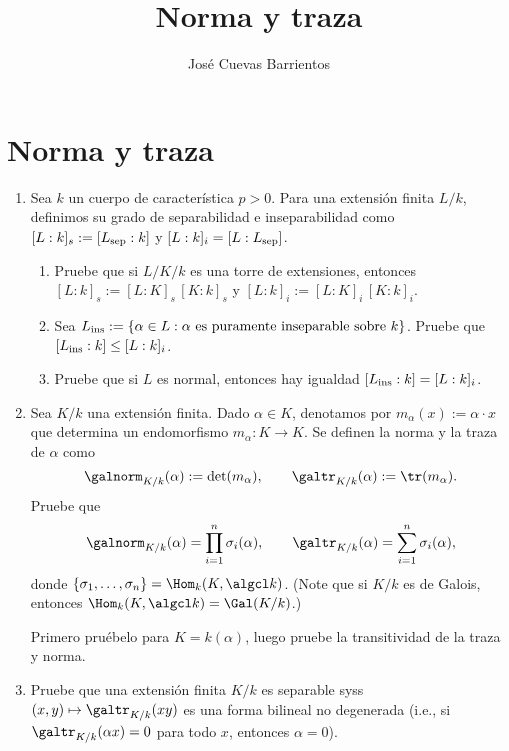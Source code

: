 \documentclass[11pt, reqno]{amsart}
\title{Norma y traza}
\date{\DTMdate{2025-08-27}}
\author{José Cuevas Barrientos}
\begin{document}
\maketitle

\section{Norma y traza}
\begin{enumerate}
	\item Sea $k$ un cuerpo de característica $p > 0$.
		Para una extensión finita $L/k$, definimos su grado de separabilidad e inseparabilidad como $[L : k]_s := [L_{\rm sep} : k]$
		y $[L : k]_i = [L : L_{\rm sep}]$.
		\begin{enumerate}
			\item Pruebe que si $L/K/k$ es una torre de extensiones, entonces $[L : k]_s := [L : K]_s \, [K : k]_s$ y $[L : k]_i
				:= [L : K]_i \, [K : k]_i$.
			\item Sea $L_{\rm ins} := \{ \alpha \in L : \alpha \text{ es puramente inseparable sobre } k \}$.
				Pruebe que $[L_{\rm ins} : k] \le [L : k]_i$.
			\item Pruebe que si $L$ es normal, entonces hay igualdad $[L_{\rm ins} : k] = [L : k]_i$.
		\end{enumerate}

	\item\lookright
		Sea $K/k$ una extensión finita.
		Dado $\alpha \in K$, denotamos por $m_\alpha(x) := \alpha\cdot x$ que determina un endomorfismo $m_\alpha \colon K \to K$.
		Se definen la norma y la traza de $\alpha$ como
		\[
			\galnorm_{K/k}(\alpha) := \det(m_\alpha), \qquad \galtr_{K/k}(\alpha) := \tr(m_\alpha).
		\]
		Pruebe que
		\[
			\galnorm_{K/k}(\alpha) = \prod_{i=1}^n\sigma_i(\alpha), \qquad \galtr_{K/k}(\alpha) = \sum_{i=1}^n \sigma_i(\alpha),
		\]
		donde $\{ \sigma_1, \dots, \sigma_n \} = \Hom_k(K, \algcl k)$.
		(Note que si $K/k$ es de Galois, entonces $\Hom_k(K, \algcl k) = \Gal(K/k)$.)

		\begin{hint}
			Primero pruébelo para $K = k(\alpha)$, luego pruebe la transitividad de la traza y norma.
		\end{hint}

	\item Pruebe que una extensión finita $K/k$ es separable syss $(x, y) \mapsto \galtr_{K/k}(xy)$ es una forma bilineal no degenerada
		(i.e., si $\galtr_{K/k}(\alpha x) = 0$ para todo $x$, entonces $\alpha = 0$).
\end{enumerate}
\end{document}
